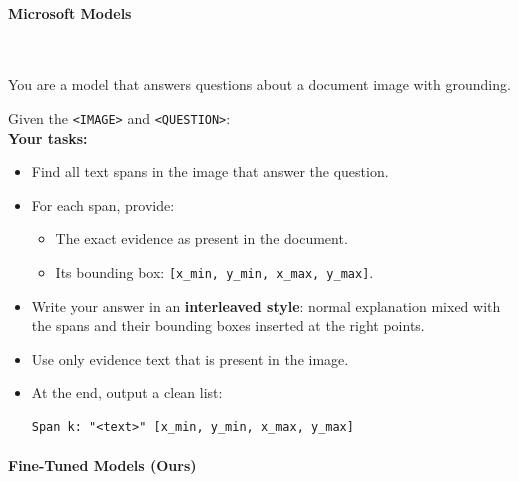 \paragraph{Microsoft Models}\mbox{}\\[4pt]

\begin{tcolorbox}[baseline_prompt_style, title=Kosmos 2.5 Chat \cite{lv2023kosmos}]

You are a model that answers questions about a document image with grounding.

Given the \texttt{<IMAGE>} and \texttt{<QUESTION>}: \\

\textbf{Your tasks:}
\begin{itemize}[leftmargin=10pt]
    \item Find all text spans in the image that answer the question.

    \item For each span, provide:
    \begin{itemize}
        \item The exact evidence as present in the document.
        \item Its bounding box: \texttt{[x\_min, y\_min, x\_max, y\_max]}.
    \end{itemize}

    \item Write your answer in an \textbf{interleaved style}: normal explanation mixed with the spans and their bounding boxes inserted at the right points.
    \item Use only evidence text that is present in the image.
    \item At the end, output a clean list:

\begin{verbatim}
Span k: "<text>" [x_min, y_min, x_max, y_max]
\end{verbatim}

\end{itemize}
\end{tcolorbox}


\paragraph{Fine-Tuned Models (Ours)}\mbox{}\\[4pt]


